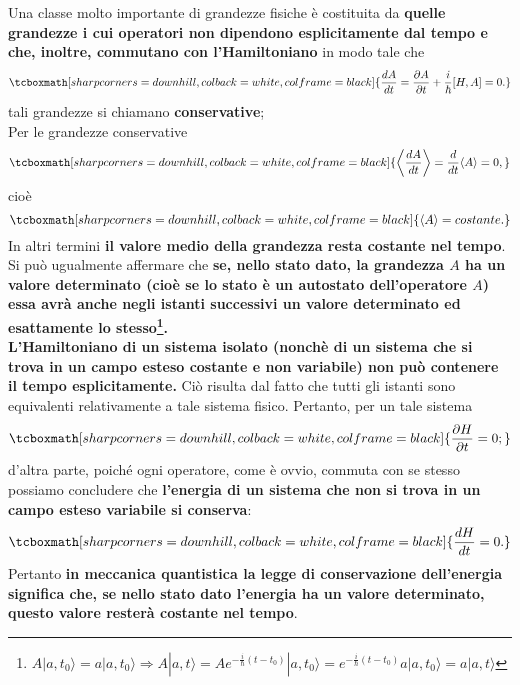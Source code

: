 Una classe molto importante di grandezze fisiche è costituita da \textbf{quelle grandezze i cui operatori non dipendono esplicitamente dal tempo e che, inoltre, commutano con l'Hamiltoniano} in modo tale che 
	\begin{equation}
		\tcboxmath[sharp corners=downhill, colback=white, colframe=black]{
			\frac{dA}{dt}= \frac{\partial A}{\partial{t}} + \frac{i}{\hbar}[H,A]=0.
			}
	\end{equation}
tali grandezze si chiamano \textbf{conservative};\\

Per le grandezze conservative 
	\begin{equation} 
		\tcboxmath[sharp corners=downhill, colback=white, colframe=black]{
			\left\langle \frac{dA}{dt}\right\rangle= \frac{d}{dt}\langle A \rangle =0,
			}
	\end{equation}
cioè 
	\begin{equation}
		\tcboxmath[sharp corners=downhill, colback=white, colframe=black]{
			\langle A \rangle= costante.
			}
	\end{equation}
In altri termini \textbf{il valore medio della grandezza resta costante nel tempo}. Si può ugualmente affermare che \textbf{se, nello stato dato, la grandezza $A$ ha un valore determinato (cioè se lo stato è un autostato dell'operatore $A$) essa avrà anche negli istanti successivi un valore determinato ed esattamente lo stesso\footnote{$A| a, t_0\rangle= a |a,t_0\rangle \Rightarrow A|a, t \rangle = Ae^{-\frac{i}{\hbar}(t-t_0)}|a,t_0\rangle=e^{-\frac{i}{\hbar}(t-t_0)}a|a,t_0\rangle=a|a,t\rangle$}.}\\

\textbf{L'Hamiltoniano di un sistema isolato (nonchè di un sistema che si trova in un campo esteso costante e non variabile) non può contenere il tempo esplicitamente.} Ciò risulta dal fatto che tutti gli istanti sono equivalenti relativamente a tale sistema fisico. Pertanto, per un tale sistema  
	\begin{equation}
		\tcboxmath[sharp corners=downhill, colback=white, colframe=black]{
			\frac{\partial H}{\partial{t}}=0;
			}
	\end{equation}
d'altra parte, poiché ogni operatore, come è ovvio, commuta con se stesso possiamo concludere che \textbf{l'energia di un sistema che non si trova in un campo esteso variabile si conserva}:
	\begin{equation}
		\tcboxmath[sharp corners=downhill, colback=white, colframe=black]{
			\frac{dH}{dt}=0.
			}
	\end{equation}
Pertanto \textbf{in meccanica quantistica la legge di conservazione dell'energia significa che, se nello stato dato l'energia ha un valore determinato, questo valore resterà costante nel tempo}.

